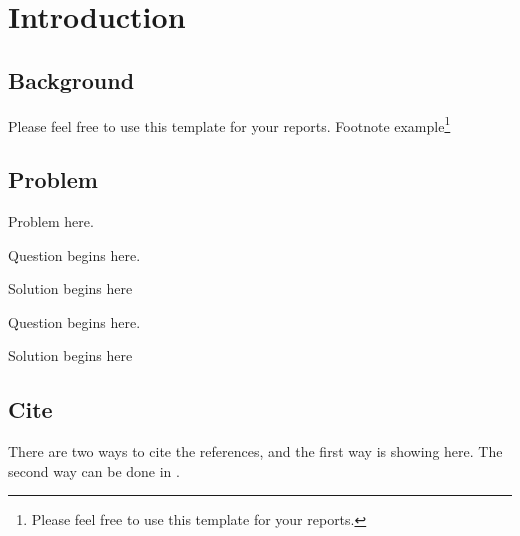 
\chapter{Introduction}

\section{Background}

Please feel free to use this template for your reports.
Footnote example\footnote{Please feel free to use this template for your reports.}



\section{Problem}

Problem here.

\begin{problem}{1}
    Question begins here.
\end{problem}

\begin{solution}
    Solution begins here
\end{solution}

\begin{problem}{2}
    Question begins here.
\end{problem}

\begin{solution}
    Solution begins here
\end{solution}






\section{Cite}

There are two ways to cite the references, and the first way \citep{nakano1923notes,honda1957mechanism} is showing here. 
The second way can be done in \cite{honda1957mechanism}.



\clearpage